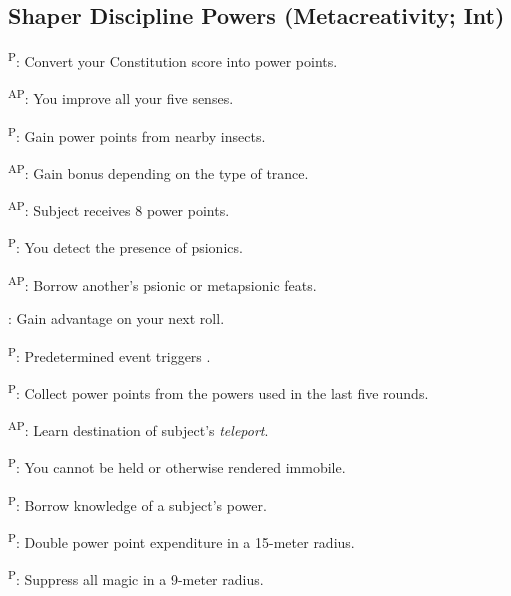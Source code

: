 \subsection{Shaper Discipline Powers {\normalsize(Metacreativity; Int)}}
\begin{enumerate*}
\item {}\textsuperscript{P}: Convert your Constitution score into power points.

      \textsuperscript{AP}: You improve all your five senses.

      \textsuperscript{P}: Gain power points from nearby insects.

      \textsuperscript{AP}: Gain bonus depending on the type of trance.

\item {}\textsuperscript{AP}: Subject receives 8 power points. %

      \textsuperscript{P}: You detect the presence of psionics.

      \textsuperscript{AP}: Borrow another's psionic or metapsionic feats. %


      : Gain advantage on your next roll.

      \textsuperscript{P}: Predetermined event triggers .

\item {}\textsuperscript{P}: Collect power points from the powers used in the last five rounds.

      \textsuperscript{AP}: Learn destination of subject's \emph{teleport}. %

\item {}\textsuperscript{P}: You cannot be held or otherwise rendered immobile.

      \textsuperscript{P}: Borrow knowledge of a subject's power.

      \textsuperscript{P}: Double power point expenditure in a 15-meter radius.

\item {}\textsuperscript{P}: Suppress all magic in a 9-meter radius.


\end{enumerate*}
